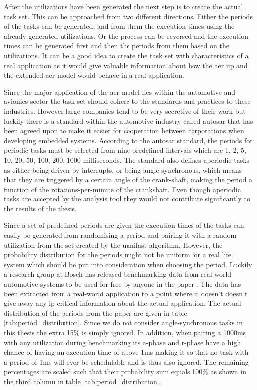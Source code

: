 \documentclass{kththesis}
\begin{document}
After the utilizations have been generated the next step is to create the actual task set. This can
be approached from two different directions. Either the periods of the tasks can be generated, and
from them the execution times using the already generated utilizations. Or the process can be
reversed and the execution times can be generated first and then the periods from them based on the
utilizations. It can be a good idea to create the task set with characteristics of a real
application as it would give valuable information about how the \acrshort{aer} \acrshort{iip} and
the extended \acrshort{aer} model would behave in a real application.

Since the major application of the \acrshort{aer} model lies within the automotive and avionics
sector the task set should cohere to the standards and practices to these industries.  However large
companies tend to be very secretive of their work but luckily there is a standard within the
automotive industry called \acrshort{autosar} that has been agreed upon to make it easier for
cooperation between corporations when developing embedded systems. According to the
\acrshort{autosar} standard, the periods for periodic tasks must be selected from nine predefined
intervals which are 1, 2, 5, 10, 20, 50, 100, 200, 1000 milliseconds. The standard also defines
aperiodic tasks as either being driven by interrupts, or being angle-synchronous, which means that
they are triggered by a certain angle of the crank-shaft, making the period a function of the
rotations-per-minute of the crankshaft. Even though aperiodic tasks are accepted by the analysis
tool they would not contribute significantly to the results of the thesis.

Since a set of predefined periods are given the execution times of the tasks can easily be generated
from randomising a period and pairing it with a random utilization from the set created by the
uunifast algorithm. However, the probability distribution for the periods might not be uniform for a
real life system which should be put into consideration when choosing the period. Luckily a research
group at Bosch has released benchmarking data from real world automotive systems to be used for
free by anyone in the paper \parencite{kramer_real_2015}.  The data has been extracted from a
real-world application to a point where it doesn't doesn't give away any \acrfull{ip}-critical
information about the actual application. The actual distribution of the periods from the paper are
given in table \ref{tab:period_distribution}. Since we do not consider angle-synchronous tasks in
this thesis the extra 15\% is simply ignored. In addition, when pairing a 1000ms with any
utilization during benchmarking its \acrshort{a}-phase and \acrshort{r}-phase have a high chance of
having an execution time of above 1ms making it so that no task with a period of 1ms will ever be
schedulable and is thus also ignored. The remaining percentages are scaled such that their
probability sum equals 100\% as shown in the third column in table \ref{tab:period_distribution}.
\end{document}

